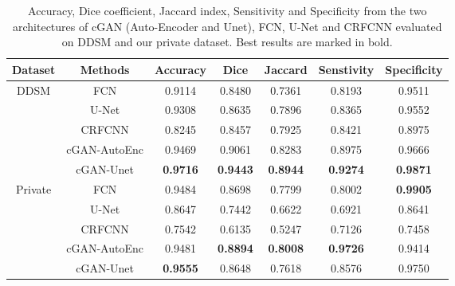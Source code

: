 \documentclass[runningheads,a4paper]{llncs}
\begin{document}
\begin{table}[!b]
\centering
\caption{Accuracy, Dice coefficient, Jaccard index, Sensitivity and Specificity from the two architectures of cGAN (Auto-Encoder and Unet), FCN, U-Net and CRFCNN evaluated on DDSM and our private dataset. Best results are marked in bold.}
\label{Table1}
\begin{tabular}{|c|c|c|c|c|c|c|}
\hline
Dataset                      & Methods         & Accuracy        & Dice            & Jaccard         & Senstivity      & Specificity     \\ \hline
\multirow{5}{*}{DDSM}        & FCN             & 0.9114          & 0.8480          & 0.7361          & 0.8193          & 0.9511          \\ \cline{2-7}
                             & U-Net           & 0.9308          & 0.8635          & 0.7896          & 0.8365          & 0.9552          \\ \cline{2-7}
                             & CRFCNN          & 0.8245          & 0.8457          & 0.7925          & 0.8421          & 0.8975          \\ \cline{2-7}
                             & cGAN-AutoEnc     & 0.9469          & 0.9061          & 0.8283          & 0.8975          & 0.9666          \\ \cline{2-7}
                             & cGAN-Unet        & \textbf{0.9716} & \textbf{0.9443} & \textbf{0.8944} & \textbf{0.9274} & \textbf{0.9871} \\ \hline
\multirow{5}{*}{Private}     & FCN             & 0.9484          & 0.8698          & 0.7799          & 0.8002          & \textbf{0.9905} \\ \cline{2-7}
                             & U-Net           & 0.8647          & 0.7442          & 0.6622          & 0.6921          & 0.8641          \\ \cline{2-7}
                             & CRFCNN          & 0.7542          & 0.6135          & 0.5247          & 0.7126          & 0.7458          \\ \cline{2-7}
                             & cGAN-AutoEnc     & 0.9481          & \textbf{0.8894} & \textbf{0.8008} & \textbf{0.9726} & 0.9414          \\ \cline{2-7}
                             & cGAN-Unet        & \textbf{0.9555} & 0.8648          & 0.7618          & 0.8576          & 0.9750          \\ \hline


\end{tabular}
\end{table}
\end{document}
